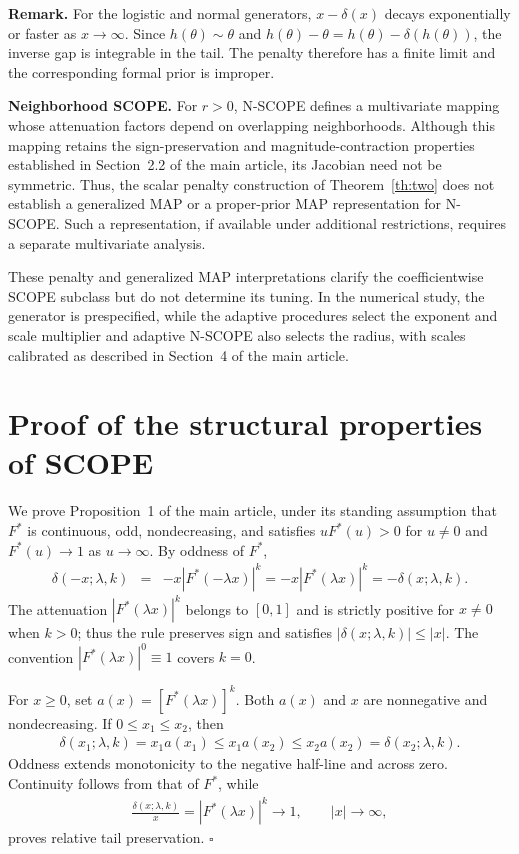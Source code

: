 \documentclass[11pt]{article}
\numberwithin{equation}{section}
\begin{document}
\medskip
\noindent
\textbf{Remark.}
For the logistic and normal generators, $x-\delta(x)$ decays exponentially or faster as $x\to\infty$. Since $h(\theta)\sim\theta$ and $h(\theta)-\theta=h(\theta)-\delta(h(\theta))$, the inverse gap is integrable in the tail. The penalty therefore has a finite limit and the corresponding formal prior is improper.

\medskip
\noindent
\medskip
\noindent
\textbf{Neighborhood SCOPE.}
For $r>0$, N-SCOPE defines a multivariate mapping whose attenuation
factors depend on overlapping neighborhoods. Although this mapping
retains the sign-preservation and magnitude-contraction properties
established in Section~2.2 of the main article, its Jacobian need not be
symmetric. Thus, the scalar penalty construction of
Theorem~\ref{th:two} does not establish a generalized MAP or a
proper-prior MAP representation for N-SCOPE. Such a representation,
if available under additional restrictions, requires a separate
multivariate analysis.

These penalty and generalized MAP interpretations clarify the
coefficientwise SCOPE subclass but do not determine its tuning. In the
numerical study, the generator is prespecified, while the adaptive procedures select the exponent and scale multiplier and adaptive N-SCOPE also selects the radius, with scales calibrated as described
in Section~4 of the main article.




\section{Proof of the structural properties of SCOPE}
\label{supp:proof-scope}

We prove Proposition~1 of the main article, under its standing assumption
that $F^*$ is continuous, odd, nondecreasing, and satisfies
$uF^*(u)>0$ for $u\ne0$ and $F^*(u)\to1$ as $u\to\infty$.
By oddness of $F^*$,
\begin{eqnarray*}
\delta(-x;\lambda,k)
&=&-x|F^*(-\lambda x)|^k
=-x|F^*(\lambda x)|^k=-\delta(x;\lambda,k).
\end{eqnarray*}
The attenuation $|F^*(\lambda x)|^k$ belongs to $[0,1]$ and is strictly
positive for $x\ne0$ when $k>0$; thus the rule preserves sign and satisfies
$|\delta(x;\lambda,k)|\leq|x|$. The convention $|F^*(\lambda x)|^0\equiv1$
covers $k=0$.

For $x\geq0$, set $a(x)=[F^*(\lambda x)]^k$. Both $a(x)$ and $x$ are
nonnegative and nondecreasing. If $0\leq x_1\leq x_2$, then
\begin{eqnarray*}
\delta(x_1;\lambda,k)=x_1a(x_1)
\leq x_1a(x_2)\leq x_2a(x_2)=\delta(x_2;\lambda,k).
\end{eqnarray*}
Oddness extends monotonicity to the negative half-line and across zero.
Continuity follows from that of $F^*$, while
\begin{eqnarray*}
\frac{\delta(x;\lambda,k)}{x}
=|F^*(\lambda x)|^k\longrightarrow1,
\qquad |x|\longrightarrow\infty,
\end{eqnarray*}
proves relative tail preservation. \hfill$\square$
\end{document}
